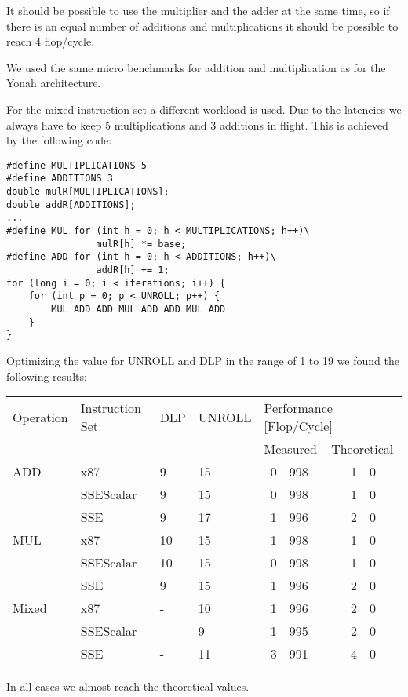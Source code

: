 \documentclass[a4paper,12pt]{article}
\begin{document}
It should be possible to use the multiplier and the adder at the same time, so
if there is an equal number of additions and multiplications it should be
possible to reach 4 flop/cycle.

We used the same micro benchmarks for addition and multiplication as for the
Yonah architecture. 

For the mixed instruction set a different workload is used. Due to the latencies
we always have to keep 5 multiplications and 3 additions in flight. This is
achieved by the following code:

\begin{lstlisting}
#define MULTIPLICATIONS 5
#define ADDITIONS 3
double mulR[MULTIPLICATIONS];
double addR[ADDITIONS];
...
#define MUL for (int h = 0; h < MULTIPLICATIONS; h++)\
				mulR[h] *= base;
#define ADD for (int h = 0; h < ADDITIONS; h++)\
				addR[h] += 1;
for (long i = 0; i < iterations; i++) {
	for (int p = 0; p < UNROLL; p++) {
		MUL ADD ADD MUL ADD ADD MUL ADD
	}
}
\end{lstlisting}


Optimizing the value for UNROLL and DLP in the range of 1 to 19 we found the
following results:

\begin{center}
\begin{tabular}{llllr@{.}lr@{.}l}
\toprule
Operation&Instruction Set & DLP & UNROLL &  \multicolumn{4}{l}{Performance
[Flop/Cycle]} \\ \cmidrule{5-8}
&&&&\multicolumn{2}{l}{Measured}&\multicolumn{2}{l}{Theoretical}\\
\midrule
ADD   & x87       &  9 & 15 & 0&998 & 1&0\\
      & SSEScalar &  9 & 15 & 0&998 & 1&0\\
      & SSE       &  9 & 17 & 1&996 & 2&0\\
MUL   & x87       & 10 & 15 & 1&998 & 1&0\\
      & SSEScalar & 10 & 15 & 0&998 & 1&0\\
      & SSE       &  9 & 15 & 1&996 & 2&0\\
Mixed & x87       &  - & 10 & 1&996 & 2&0\\
      &SSEScalar  &  - &  9 & 1&995 & 2&0\\
      &SSE        &  - & 11 & 3&991 & 4&0\\
\bottomrule
\end{tabular}
\end{center}

In all cases we almost reach the theoretical values.
\end{document}
